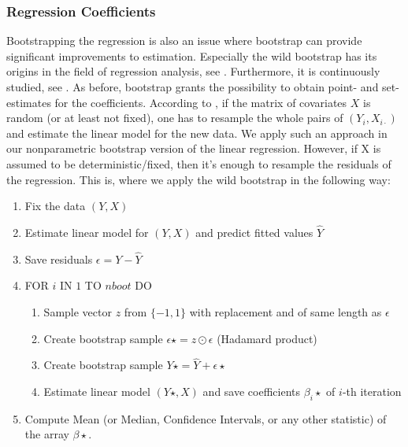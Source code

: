 	\subsubsection*{Regression Coefficients}
Bootstrapping the regression is also an issue where bootstrap can provide significant improvements to estimation. Especially the wild bootstrap has its origins in the field of regression analysis, see \citet{wboot1}. Furthermore, it is continuously studied, see \citet{wboot2}. As before, bootstrap grants the possibility to obtain point- and set-estimates for the coefficients. According to \citet{regression}, if the matrix of covariates $X$ is random (or at least not fixed), one has to resample the whole pairs of $(Y_i, X_{i\cdot})$ and estimate the linear model for the new data. We apply such an approach in our nonparametric bootstrap version of the linear regression. However, if X is assumed to be deterministic/fixed, then it's enough to resample the residuals of the regression. This is, where we apply the wild bootstrap in the following way:
\begin{enumerate}
	\item Fix the data $(Y, X)$
	\item Estimate linear model for $(Y, X)$ and predict fitted values $\hat{Y}$
	\item Save residuals $\epsilon = Y - \hat{Y}$
	\item FOR $i$ IN $1$ TO $nboot$ DO
	\begin{enumerate}
		\item Sample vector $z$ from $\{-1,1\}$ with replacement and of same length as $\epsilon$
		\item Create bootstrap sample $\epsilon\star = z \odot \epsilon$ (Hadamard product)
		\item Create bootstrap sample $Y\star = \hat{Y} + \epsilon\star$
		\item Estimate linear model $(Y\star, X)$ and save coefficients $\beta_i\star$ of $i$-th iteration
	\end{enumerate}
	\item Compute Mean (or Median, Confidence Intervals, or any other statistic) of the array $\beta\star$.
\end{enumerate}
